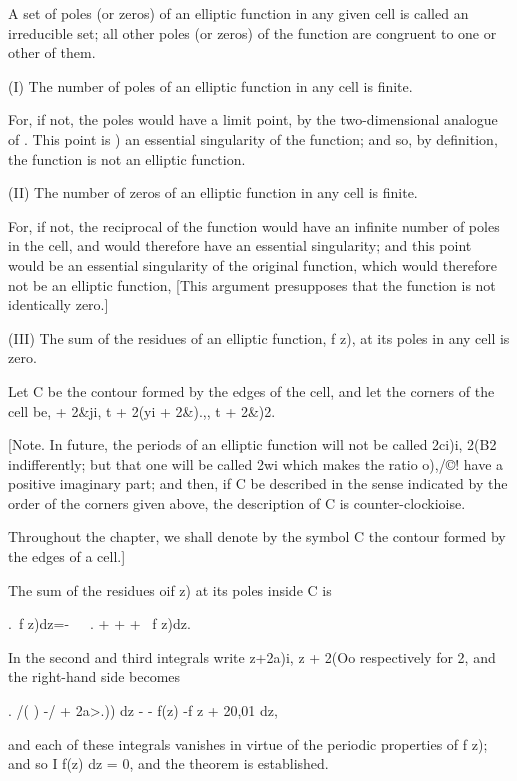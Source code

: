 A set of poles (or zeros) of an elliptic function in any given cell is
called an irreducible set; all other poles (or zeros) of the function
are congruent to one or other of them.

%
%


(I) The number of poles of an elliptic function in any cell is finite.

For, if not, the poles would have a limit point, by the
two-dimensional analogue of . This point is ) an
essential singularity of the function; and so, by definition, the
function is not an elliptic function.

(II) The number of zeros of an elliptic function in any cell is
finite.

For, if not, the reciprocal of the function would have an infinite
number of poles in the cell, and would therefore have an essential
singularity; and this point would be an essential singularity of the
original function, which would therefore not be an elliptic function,
[This argument presupposes that the function is not identically zero.]

(III) The sum of the residues of an elliptic function, f z), at its
poles in any cell is zero.

Let C be the contour formed by the edges of the cell, and let the
corners of the cell be, + 2\&ji, t + 2(yi + 2\&).,, t + 2\&)2.

[Note. In future, the periods of an elliptic function will not be
called 2ci)i, 2(B2 indifferently; but that one will be called 2wi
which makes the ratio o),/©! have a positive imaginary part; and
then, if C be described in the sense indicated by the order of the
corners given above, the description of C is counter-clockioise.

Throughout the chapter, we shall denote by the symbol C the contour
formed by the edges of a cell.]

The sum of the residues oif z) at its poles inside C is

 .\ f z)dz=-~\ \ . + + + \ f z)dz.

In the second and third integrals write z+2a)i, z + 2(Oo respectively
for 2, and the right-hand side becomes

 . /( ) -/ + 2a>.)) dz - - f(z) -f z + 20,01 dz,

and each of these integrals vanishes in virtue of the periodic
properties of f z); and so I f(z) dz = 0, and the theorem is
established.

